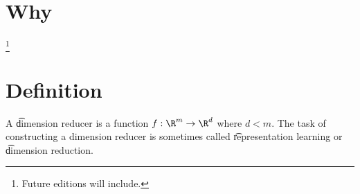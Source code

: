 
\section*{Why}
\footnote{Future editions will include.}
\section*{Definition}

A \t{dimension reducer} is a function $f: \R ^m \to \R ^d$ where $d < m$.
The task of constructing a dimension reducer is sometimes called \t{representation learning} or \t{dimension reduction}.

\blankpage